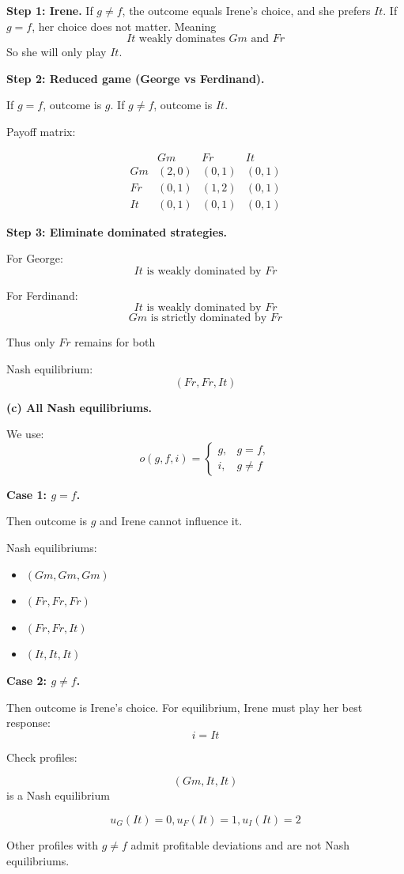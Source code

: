 \textbf{Step 1: Irene.}
If $g\neq f$, the outcome equals Irene's choice, and she prefers $It$. If $g=f$, her choice does not matter. Meaning
\[
It \text{ weakly dominates } Gm \text{ and } Fr
\]
So she will only play $It$.

\medskip

\textbf{Step 2: Reduced game (George vs Ferdinand).}

If $g=f$, outcome is $g$. If $g\neq f$, outcome is $It$.

Payoff matrix:

\[
\begin{array}{c|ccc}
 & Gm & Fr & It\\
\hline
Gm & (2,0) & (0,1) & (0,1)\\
Fr & (0,1) & (1,2) & (0,1)\\
It & (0,1) & (0,1) & (0,1)
\end{array}
\]

\medskip

\textbf{Step 3: Eliminate dominated strategies.}

For George:
\[
It \text{ is weakly dominated by } Fr
\]

For Ferdinand:
\[
It \text{ is weakly dominated by } Fr
\]
\[
Gm \text{ is strictly dominated by } Fr
\]

Thus only $Fr$ remains for both

\medskip

Nash equilibrium:
\[
(Fr,Fr,It)
\]

\textbf{(c) All Nash equilibriums.}

We use:
\[
o(g,f,i)=
\begin{cases}
g, & g=f,\\
i, & g\neq f
\end{cases}
\]

\medskip

\textbf{Case 1: $g=f$.}

Then outcome is $g$ and Irene cannot influence it.

Nash equilibriums:
\begin{itemize}
\item $(Gm,Gm,Gm)$
\item $(Fr,Fr,Fr)$
\item $(Fr,Fr,It)$
\item $(It,It,It)$
\end{itemize}

\medskip

\textbf{Case 2: $g\neq f$.}

Then outcome is Irene's choice. For equilibrium, Irene must play her best response:
\[
i=It
\]

Check profiles:




\[
(Gm,It,It)
\]
is a Nash equilibrium

\[
u_G(It) = 0,
u_F(It) = 1,
u_I(It) = 2
\]

Other profiles with $g\neq f$ admit profitable deviations and are not Nash equilibriums.

\medskip
